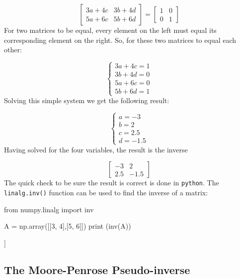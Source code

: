 \begin{equation*}
\begin{bmatrix}
3a+4c & 3b+4d\\
5a+6c & 5b+6d
\end{bmatrix}
=
\begin{bmatrix}
1 & 0\\
0 & 1
\end{bmatrix}
\end{equation*}
For two matrices to be equal, every element on the left must equal its corresponding element on the right. So, for these two matrices to equal each other:

\begin{equation*}
\begin{cases}
3a+4c=1\\
3b+4d=0\\
5a+6c=0\\
5b+6d=1
\end{cases}
\end{equation*}
Solving this simple system we get the following result:

\begin{equation*}
\begin{cases}
a=-3\\
b=2\\
c=2.5\\
d=-1.5
\end{cases}
\end{equation*}
Having solved for the four variables, the result is the inverse

\begin{equation*}
\begin{bmatrix}
-3 & 2\\
2.5 & -1.5
\end{bmatrix}
\end{equation*}
The quick check to be sure the result is correct is done in \texttt{python}. The \texttt{linalg.inv()} function can be used to find the inverse of a matrix:

\begin{ipythonnon}
from numpy.linalg import inv

A = np.array([[3, 4],[5, 6]])	
print (inv(A))
\end{ipythonnon}
\begin{ioutput}
[[-3.   2. ]
 [ 2.5 -1.5]]
\end{ioutput}

\subsection{The Moore-Penrose Pseudo-inverse}
\label{sec:the-moore-penrose-pseudoinverse}

